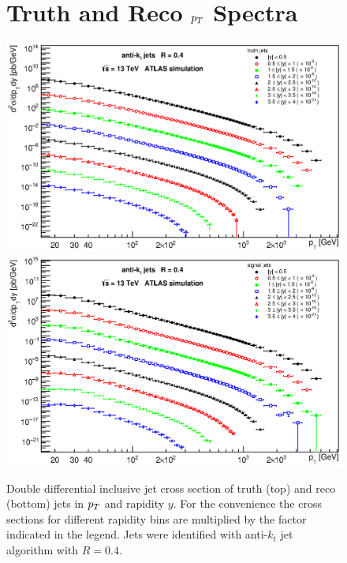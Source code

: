 \begin{appendices}
\begin{figure}[p]
\section{Truth and Reco $p_{T}$ Spectra}
\label{sec:TruthAndRecoSpectra}
  \centering
  \includegraphics[width=\textwidth]{Chapter3/ptTruthAllRapidityBins.eps}
  \includegraphics[width=\textwidth]{Chapter3/ptSignalAllRapidityBins.eps}
  \caption{Double differential inclusive jet cross section of truth (top) and
    reco (bottom) jets in $p_{T}$ and rapidity $y$.  For the convenience the cross
    sections for different rapidity bins are multiplied by the factor indicated
    in the legend. Jets were identified with anti-$k_t$ jet algorithm with
    $R=0.4$.}
  \label{fig:ptSpectraMasacreEverythingFuck}
\end{figure}



\end{appendices}
